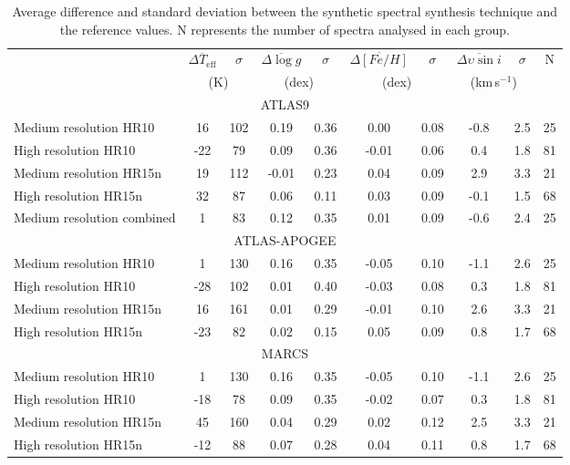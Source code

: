 \documentclass[fleqn,usenatbib]{mnras}
\begin{document}
 \begin{table*}
 \caption{Average difference and standard deviation between the synthetic spectral synthesis technique and the reference values. N represents the number of spectra analysed in each group.}
 \label{results_table_medium}
 \begin{tabular}{lccccccccc}
 \hline\hline
      & $\overline{\Delta T_{\mathrm{eff}}}$ & $\sigma$ & $\overline{\Delta \log g}$ & $\sigma$ & $\overline{\Delta [Fe/H]}$ & $\sigma$ & $\overline{\Delta \upsilon\sin i}$ & $\sigma$ & N\\
      & \multicolumn{2}{c}{(K)} & \multicolumn{2}{c}{ (dex)} & \multicolumn{2}{c}{(dex)} & \multicolumn{2}{c}{ (km\,s$^{-1}$)} & \\
 \hline
 \multicolumn{10}{c}{ATLAS9} \\

Medium resolution HR10     & 16  & 102 & 0.19  & 0.36 & 0.00  & 0.08 & -0.8 & 2.5 & 25 \\
High resolution HR10       & -22 & 79  & 0.09  & 0.36 & -0.01 & 0.06 & 0.4  & 1.8 & 81 \\
Medium resolution HR15n    & 19  & 112 & -0.01 & 0.23 & 0.04  & 0.09 & 2.9  & 3.3 & 21 \\
High resolution HR15n      & 32  & 87  & 0.06  & 0.11 & 0.03  & 0.09 & -0.1 & 1.5 & 68 \\
Medium resolution combined & 1   & 83  & 0.12  & 0.35 & 0.01  & 0.09 & -0.6 & 2.4 & 25 \\
\hline
\multicolumn{10}{c}{ATLAS-APOGEE} \\
Medium resolution HR10  & 1   & 130 & 0.16  & 0.35 & -0.05 & 0.10 & -1.1 & 2.6 & 25 \\
High resolution HR10    & -28 & 102 & 0.01  & 0.40 & -0.03 & 0.08 & 0.3  & 1.8 & 81 \\
Medium resolution HR15n & 16  & 161 & 0.01  & 0.29 & -0.01 & 0.10 & 2.6  & 3.3 & 21 \\
High resolution HR15n   & -23 & 82  & 0.02  & 0.15 & 0.05  & 0.09 & 0.8  & 1.7 & 68 \\
\hline
\multicolumn{10}{c}{MARCS} \\
Medium resolution HR10  & 1   & 130 & 0.16 & 0.35 & -0.05 & 0.10 & -1.1 & 2.6 & 25 \\
High resolution HR10    & -18 & 78  & 0.09 & 0.35 & -0.02 & 0.07 & 0.3  & 1.8 & 81 \\
Medium resolution HR15n & 45  & 160 & 0.04 & 0.29 & 0.02  & 0.12 & 2.5  & 3.3 & 21 \\
High resolution HR15n   & -12 & 88  & 0.07 & 0.28 & 0.04  & 0.11 & 0.8  & 1.7 & 68 \\
\hline
\end{tabular}
\end{table*}
\end{document}
